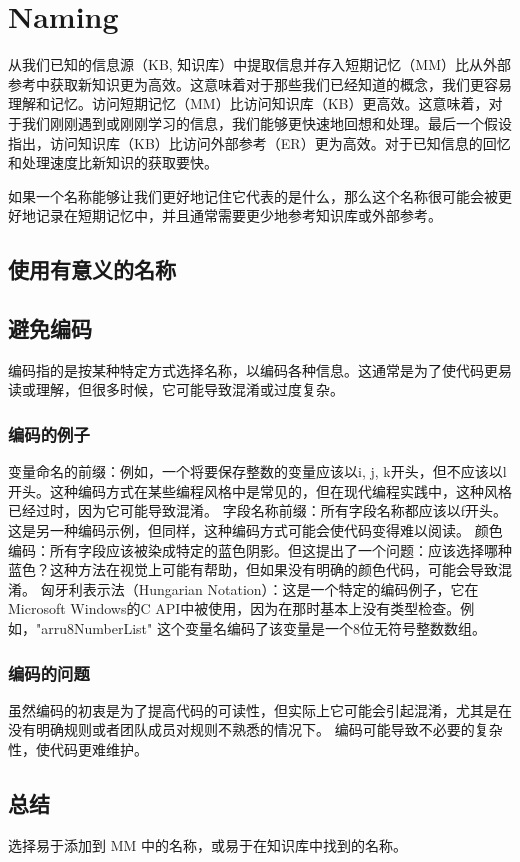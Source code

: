\chapter{Naming}

从我们已知的信息源（KB, 知识库）中提取信息并存入短期记忆（MM）比从外部参考中获取新知识更为高效。这意味着对于那些我们已经知道的概念，我们更容易理解和记忆。访问短期记忆（MM）比访问知识库（KB）更高效。这意味着，对于我们刚刚遇到或刚刚学习的信息，我们能够更快速地回想和处理。最后一个假设指出，访问知识库（KB）比访问外部参考（ER）更为高效。对于已知信息的回忆和处理速度比新知识的获取要快。

如果一个名称能够让我们更好地记住它代表的是什么，那么这个名称很可能会被更好地记录在短期记忆中，并且通常需要更少地参考知识库或外部参考。
\section{使用有意义的名称}
\section{避免编码}
编码指的是按某种特定方式选择名称，以编码各种信息。这通常是为了使代码更易读或理解，但很多时候，它可能导致混淆或过度复杂。

\subsection{编码的例子}
变量命名的前缀：例如，一个将要保存整数的变量应该以i, j, k开头，但不应该以l开头。这种编码方式在某些编程风格中是常见的，但在现代编程实践中，这种风格已经过时，因为它可能导致混淆。
字段名称前缀：所有字段名称都应该以f开头。这是另一种编码示例，但同样，这种编码方式可能会使代码变得难以阅读。
颜色编码：所有字段应该被染成特定的蓝色阴影。但这提出了一个问题：应该选择哪种蓝色？这种方法在视觉上可能有帮助，但如果没有明确的颜色代码，可能会导致混淆。
匈牙利表示法（Hungarian Notation）：这是一个特定的编码例子，它在Microsoft Windows的C API中被使用，因为在那时基本上没有类型检查。例如，"arru8NumberList" 这个变量名编码了该变量是一个8位无符号整数数组。

\subsection{编码的问题}
虽然编码的初衷是为了提高代码的可读性，但实际上它可能会引起混淆，尤其是在没有明确规则或者团队成员对规则不熟悉的情况下。
编码可能导致不必要的复杂性，使代码更难维护。

\section{总结}
选择易于添加到 MM 中的名称，或易于在知识库中找到的名称。